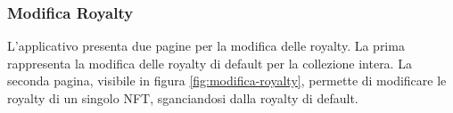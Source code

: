 \subsubsection{Modifica Royalty}

  L'applicativo presenta due pagine per la modifica delle royalty. La prima rappresenta la modifica delle royalty di default per la collezione intera. La seconda pagina, visibile in figura \ref{fig:modifica-royalty}, permette di modificare le royalty di un singolo NFT, sganciandosi dalla royalty di default.

  \begin{figure}[H]
    \begin{minipage}{0.7\textwidth}
      \centering
    \end{minipage}
    \hfill
    \begin{minipage}{0.26\textwidth }
      \centering

\end{minipage}
\end{figure}
